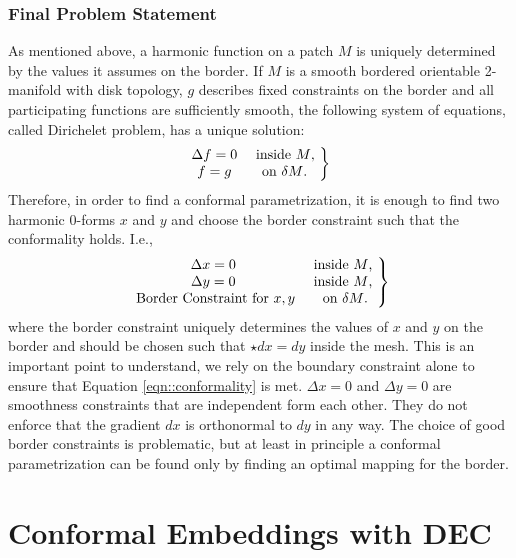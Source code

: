 \subsubsection{Final Problem Statement}

As mentioned above, a harmonic function on a patch $M$ is uniquely determined by the values it assumes on the border. If $M$ is a smooth bordered orientable 2-manifold with disk topology, $g$ describes fixed constraints on the border and all participating functions are sufficiently smooth, the following system of equations, called Dirichelet problem, has a unique solution:
\[\left.\begin{matrix}
 \Delta f = 0 & \text{ inside $ M$, } \\
  f = g & \text{ on $ \delta M$. } \\
\end{matrix}\right\rbrace\]
Therefore, in order to find a conformal parametrization, it is enough to find two harmonic 0-forms $x$ and $y$ and choose the border constraint such that the conformality holds. I.e.,
\begin{equation}\left.\begin{matrix}
 \Delta x = 0 & \text{ inside $ M$, } \\
 \Delta y = 0 & \text{ inside $ M$, } \\
 \text{ Border Constraint for $x,y$} & \text{ on $ \delta M$.} \\
\end{matrix}\right\rbrace \label{eq:conformalProblemStatement}\end{equation}
where the border constraint uniquely determines the values of $x$ and $y$ on the border and should be chosen such that $\star dx = dy$ inside the mesh. This is an important point to understand, we rely on the boundary constraint alone to ensure that Equation \ref{eqn::conformality} is met. $\Delta x = 0$ and $\Delta y = 0$ are smoothness constraints that are independent form each other. They do not enforce that the gradient $dx$ is orthonormal to $dy$ in any way.  The choice of good border constraints is problematic, but at least in principle a conformal parametrization can be found only by finding an optimal mapping for the border. 


\section{Conformal Embeddings with DEC}

